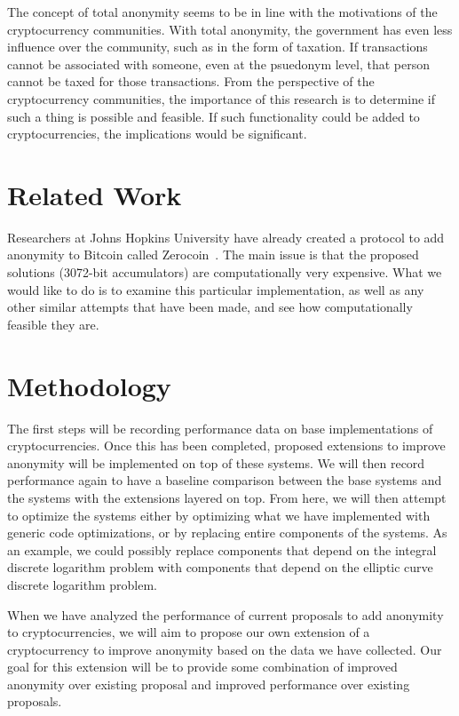 \documentclass[11pt]{artikel3}
\begin{document}
The concept of total anonymity seems to be in line with the motivations of the
cryptocurrency communities. With total anonymity, the government has even less
influence over the community, such as in the form of taxation. If transactions
cannot be associated with someone, even at the psuedonym level, that person
cannot be taxed for those transactions. From the perspective of the
cryptocurrency communities, the importance of this research is to determine if
such a thing is possible and feasible. If such functionality could be added to
cryptocurrencies, the implications would be significant.

\section{Related Work}
Researchers at Johns Hopkins University have already created a protocol to add
anonymity to Bitcoin called Zerocoin~\cite{Miers13}. The main issue is
that the proposed solutions (3072-bit accumulators) are computationally very
expensive. What we would like to do is to examine this particular implementation,
as well as any other similar attempts that have been made, and see how
computationally feasible they are.

\section{Methodology}
The first steps will be recording performance data on base implementations of
cryptocurrencies. Once this has been completed, proposed extensions to improve
anonymity will be implemented on top of these systems. We will then record
performance again to have a baseline comparison between the base systems and the
systems with the extensions layered on top. From here, we will then attempt to
optimize the systems either by optimizing what we have implemented with generic
code optimizations, or by replacing entire components of the systems. As an
example, we could possibly replace components that depend on the integral discrete
logarithm problem with components that depend on the elliptic curve discrete
logarithm problem.

When we have analyzed the performance of current proposals to add anonymity to
cryptocurrencies, we will aim to propose our own extension of a cryptocurrency
to improve anonymity based on the data we have collected. Our goal for this
extension will be to provide some combination of improved anonymity over
existing proposal and improved performance over existing proposals.
\end{document}

